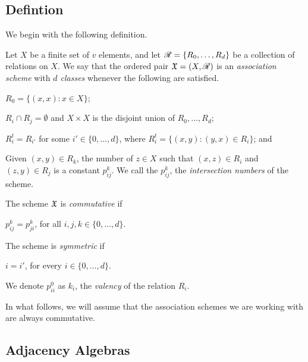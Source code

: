 \documentclass[../../../main]{subfiles}
\begin{document}

\subsection{Defintion}

 We begin with the following definition.
 
 \begin{defin}\label{ass-scheme-def}
  Let $X$ be a finite set of $v$ elements, and let $\mathscr{R}=\{R_0, \dots, R_d\}$ be a collection of relations on $X$. We say that the ordered pair $\mathfrak{X}=(X,\mathscr{R})$ is an {\it association scheme} with {\it $d$ classes} whenever the following are satisfied.
  \begin{defenum}
   \item $R_0=\{(x,x) : x \in X\}$;
   \item $R_i \cap R_j = \emptyset$ and $X \times X$ is the disjoint union of $R_0, \dots, R_d$;
   \item $R_i^t=R_{i'}$ for some $i' \in \{0, \dots, d\}$, where $R_i^t=\{(x,y) : (y,x) \in R_i\}$; and
   \item Given $(x,y) \in R_k$, the number of $z \in X$ such that $(x,z) \in R_i$ and $(z,y) \in R_j$ is a constant $p_{ij}^k$. We call the $p_{ij}^k$, the {\it intersection numbers} of the scheme.
  \end{defenum}
  The scheme $\mathfrak{X}$ is {\it commutative} if
  \begin{defenum}[resume]
   \item $p_{ij}^k=p_{ji}^k$, for all $i,j,k \in \{0, \dots, d\}$.
  \end{defenum}
  The scheme is {\it symmetric} if
  \begin{defenum}[resume]
   \item $i=i'$, for every $i \in \{0, \dots, d\}$.
  \end{defenum}
  We denote $p_{ii}^0$ as $k_i$, the {\it valency} of the relation $R_i$.
 \end{defin}
 
 In what follows, we will assume that the association schemes we are working
 with are always commutative. 
 
 \dinkus


\subsection{Adjacency Algebras} 
\end{document}
